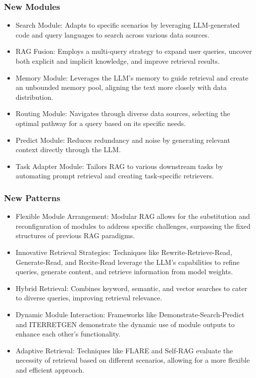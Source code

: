 \subsubsection{New Modules}
\begin{itemize}
	\item Search Module: Adapts to specific scenarios by leveraging LLM-generated code and query languages to search across various data sources.
	\item RAG Fusion: Employs a multi-query strategy to expand user queries, uncover both explicit and implicit knowledge, and improve retrieval results.
	\item Memory Module: Leverages the LLM's memory to guide retrieval and create an unbounded memory pool, aligning the text more closely with data distribution.
	\item Routing Module: Navigates through diverse data sources, selecting the optimal pathway for a query based on its specific needs.
	\item Predict Module: Reduces redundancy and noise by generating relevant context directly through the LLM.
	\item Task Adapter Module: Tailors RAG to various downstream tasks by automating prompt retrieval and creating task-specific retrievers.
\end{itemize}
\subsubsection{New Patterns} 
\begin{itemize}
	\item Flexible Module Arrangement: Modular RAG allows for the substitution and reconfiguration of modules to address specific challenges, surpassing the fixed structures of previous RAG paradigms.
	\item Innovative Retrieval Strategies: Techniques like Rewrite-Retrieve-Read, Generate-Read, and Recite-Read leverage the LLM's capabilities to refine queries, generate content, and retrieve information from model weights.
	\item Hybrid Retrieval: Combines keyword, semantic, and vector searches to cater to diverse queries, improving retrieval relevance.
	\item Dynamic Module Interaction: Frameworks like Demonstrate-Search-Predict and ITERRETGEN demonstrate the dynamic use of module outputs to enhance each other's functionality.
	\item Adaptive Retrieval: Techniques like FLARE and Self-RAG evaluate the necessity of retrieval based on different scenarios, allowing for a more flexible and efficient approach.
	
\end{itemize}
